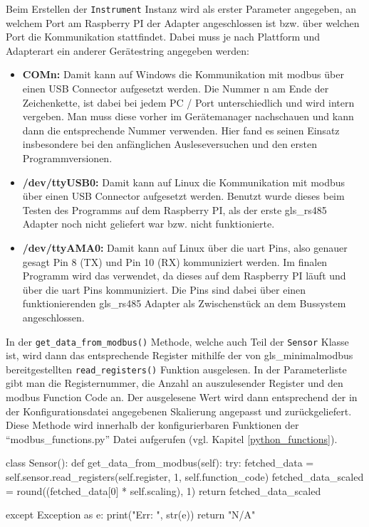 Beim Erstellen der \lstinline{Instrument} Instanz wird als erster Parameter angegeben, an welchem Port am Raspberry PI der Adapter angeschlossen ist bzw. über welchen Port die Kommunikation stattfindet. Dabei muss je nach Plattform und Adapterart ein anderer Gerätestring angegeben werden:
\begin{itemize}
\item \textbf{COMn:} Damit kann auf Windows die Kommunikation mit \gls{modbus} über einen USB Connector aufgesetzt werden. Die Nummer n am Ende der Zeichenkette, ist dabei bei jedem PC / Port unterschiedlich und wird intern vergeben. Man muss diese vorher im Gerätemanager nachschauen und kann dann die entsprechende Nummer verwenden. Hier fand es seinen Einsatz insbesondere bei den anfänglichen Ausleseversuchen und den ersten Programmversionen.
\item \textbf{/dev/ttyUSB0:} Damit kann auf Linux die Kommunikation mit \gls{modbus} über einen USB Connector aufgesetzt werden. Benutzt wurde dieses beim Testen des Programms auf dem Raspberry PI, als der erste \gls{gls_rs485} Adapter noch nicht geliefert war bzw. nicht funktionierte.
\item \textbf{/dev/ttyAMA0:} Damit kann auf Linux über die \ac{uart} Pins, also genauer gesagt Pin 8 (TX) und Pin 10 (RX) kommuniziert werden. Im finalen Programm wird das verwendet, da dieses auf dem Raspberry PI läuft und über die \ac{uart} Pins kommuniziert. Die Pins sind dabei über einen funktionierenden \gls{gls_rs485} Adapter als Zwischenstück an dem Bussystem angeschlossen.
\end{itemize}

\vfill

\label{get_data_from_modbus}
In der \lstinline{get_data_from_modbus()} Methode, welche auch Teil der \lstinline{Sensor} Klasse ist, wird dann das entsprechende Register mithilfe der von \gls{gls_minimalmodbus} bereitgestellten \lstinline{read_registers()} Funktion ausgelesen. In der Parameterliste gibt man die Registernummer, die Anzahl an auszulesender Register und den \gls{modbus} Function Code an. Der ausgelesene Wert wird dann entsprechend der in der Konfigurationsdatei angegebenen Skalierung angepasst und zurückgeliefert. Diese Methode wird innerhalb der konfigurierbaren Funktionen der \enquote{modbus\_functions.py} Datei aufgerufen (vgl. Kapitel \ref{python_functions}).

\begin{pythoncode}
class Sensor():
	def get_data_from_modbus(self):
		try:
			fetched_data = self.sensor.read_registers(self.register, 1, self.function_code)
			fetched_data_scaled = round((fetched_data[0] * self.scaling), 1)
			return fetched_data_scaled
		
		except Exception as e:
			print("Err: ", str(e))
			return "N/A"
\end{pythoncode}

